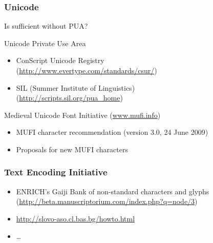 \documentclass[pdfpagemode=UseNone]{beamer}
\begin{document}
\begin{frame}
  \frametitle{Unicode}

  Is sufficient without PUA?

  \begin{block}{Unicode Private Use Area}
      \begin{itemize}
      \item ConScript Unicode Registry\\
        (\url{http://www.evertype.com/standards/csur/})
      \item SIL (Summer Institute of Linguistics)\\
        (\url{http://scripts.sil.org/pua_home})
      \end{itemize}
    \end{block}

        \begin{block}{Medieval Unicode Font Initiative
        (\url{www.mufi.info})}
      \begin{itemize}
      \item MUFI character recommendation (version 3.0, 24 June 2009)
      \item Proposals for new MUFI characters 
      \end{itemize}
        \end{block}
\end{frame}

\begin{frame}
 \frametitle{Text Encoding Initiative}
 \begin{itemize}
 \item ENRICH's Gaiji Bank of non-standard
        characters and glyphs\\
        (\url{http://beta.manuscriptorium.com/index.php?q=node/3})
      \item \url{http://slovo-aso.cl.bas.bg/howto.html}
      \item \ldots
 \end{itemize}
\end{frame}
\end{document}
